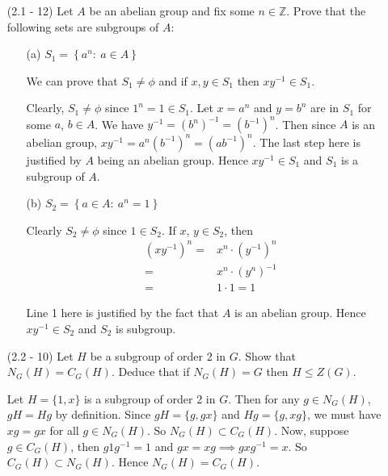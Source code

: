 \documentclass[12pt]{article}
\begin{document}
\begin{enumerate}
\item[(2.1 - 12)] Let $A$ be an abelian group and fix some
    $n\in\mathbb{Z}$. Prove that the following sets are
    subgroups of $A$:
    \begin{enumerate}
        \item[(a)] $S_1=\left\{a^n : \ a\in A\right\}$
        \begin{mybox}
            
            We can prove that $S_1\neq \phi$ and if $x,y\in S_1$ then
            $xy^{-1}\in S_1$.

            \vspace*{2mm}
            Clearly, $S_1\neq \phi$ since $1^n=1\in S_1$.
            Let $x=a^n$ and $y=b^n$ are in $S_1$ for some
            $a$, $b \in A$. We have $y^{-1}=(b^n)^{-1}=(b^{-1})^n$.
            Then since $A$ is an abelian group,
            $xy^{-1}=a^n (b^{-1})^n=(ab^{-1})^n$. The last step here
            is justified by $A$ being an abelian group. Hence
            $xy^{-1}\in S_1$ and $S_1$ is a subgroup of $A$.
        \end{mybox}

        \item[(b)] $S_2=\left\{a\in A: \ a^n=1\right\}$
        \begin{mybox}
            
            Clearly $S_2\neq \phi$ since $1\in S_2$.
            If $x$, $y\in S_2$, then 
            \begin{align}
                (xy^{-1})^n=&x^n\cdot (y^{-1})^n\\
                =&x^n\cdot (y^n)^{-1}\\
                =& 1\cdot 1=1
            \end{align}

            Line 1 here is justified by the fact that $A$
            is an abelian group. Hence $xy^{-1}\in S_2$ and
            $S_2$ is subgroup.
        \end{mybox}
    \end{enumerate}

 
\item[(2.2 - 10)] Let $H$ be a subgroup of order 2 in $G$. Show that
    $N_G(H) = C_G(H)$. Deduce that if $N_G(H) = G$ then
    $H\leq Z(G)$.

\begin{mybox}

    Let $H=\{1,x\}$ is a subgroup of order 2 in $G$.
    Then for any $g\in N_G(H)$, $gH=Hg$ by definition.
    Since $gH=\{g,gx\}$ and $Hg=\{g,xg\}$, we must have
    $xg=gx$ for all $g\in N_G(H)$. So $N_G(H)\subset
    C_G(H)$. Now, suppose $g\in C_G(H)$, then $g1g^{-1}
    =1$ and $gx=xg\implies gxg^{-1}=x$. So $C_G(H)
    \subset N_G(H)$. Hence $N_G(H)=C_G(H)$.


\end{mybox}
\end{enumerate}
\end{document}
